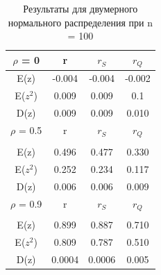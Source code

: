 \documentclass[a4]{article}
\begin{document}
		\begin{table}[h!]
			
			\caption{Результаты для двумерного нормального распределения при  n = 100}
			\label{tab:my_label}
			\begin{center}
				\vspace{5mm}
				\begin{tabular}{|c|c|c|c|}
					\hline
					$\rho$ = 0 & r & $r_S$ & $r_Q$ \\
					\hline
					E(z) & -0.004 & -0.004 & -0.002\\
					\hline
					E($z^2$)   & 0.009 & 0.009 & 0.1\\
					\hline
					D(z)   & 0.009 & 0.009 & 0.010 \\
					\hline
					$\rho$ = 0.5 & r & $r_S$ & $r_Q$ \\
					\hline\\
					\hline
					E(z) & 0.496 & 0.477 & 0.330\\
					\hline
					E($z^2$)   & 0.252 & 0.234 & 0.117\\
					\hline
					D(z)   & 0.006 & 0.006 & 0.009 \\
					\hline
					$\rho$ = 0.9 & r & $r_S$ & $r_Q$ \\
					\hline\\
					\hline
					E(z) & 0.899 & 0.887 & 0.710\\
					\hline
					E($z^2$)   & 0.809 & 0.787 & 0.510\\
					\hline
					D(z)   & 0.0004 & 0.0006 & 0.005 \\
					\hline
				\end{tabular}
				
			\end{center}
			
		\end{table}
		
\end{document}
